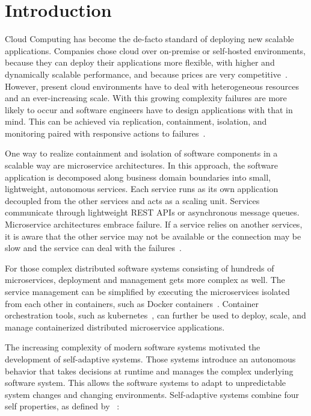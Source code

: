 
\section{Introduction}\label{sec:introduction}
  Cloud Computing has become the de-facto standard of deploying new scalable applications.
  Companies chose cloud over on-premise or self-hosted environments, because they can deploy their applications more flexible, with higher and dynamically scalable performance, and because prices are very competitive~\cite{ToffettiMicroservices}.
  However, present cloud environments have to deal with heterogeneous resources and an ever-increasing scale.
  With this growing complexity failures are more likely to occur and software engineers have to design applications with that in mind.
  This can be achieved via replication, containment, isolation, and monitoring paired with responsive actions to failures~\cite{reactivemanifesto}.

  One way to realize containment and isolation of software components in a scalable way are microservice architectures.
  In this approach, the software application is decomposed along business domain boundaries into small, lightweight, autonomous services.
  Each service runs as its own application decoupled from the other services and acts as a scaling unit.
  Services communicate through lightweight REST APIs or asynchronous message queues.
  Microservice architectures embrace failure.
  If a service relies on another services, it is aware that the other service may not be available or the connection may be slow and the service can deal with the failures~\cite{microservices}.

  For those complex distributed software systems consisting of hundreds of microservices, deployment and management gets more complex as well.
  The service management can be simplified by executing the microservices isolated from each other in containers, such as Docker containers~\cite{docker}.
  Container orchestration tools, such as \gls{kubernetes}~\cite{kubernetes}, can further be used to deploy, scale, and manage containerized distributed microservice applications.

  The increasing complexity of modern software systems motivated the development of self-adaptive systems.
  Those systems introduce an autonomous behavior that takes decisions at runtime and manages the complex underlying software system.
  This allows the software systems to adapt to unpredictable system changes and changing environments.
  Self-adaptive systems combine four self properties, as defined by \citeauthor{Ganek}~\cite{Ganek}:

